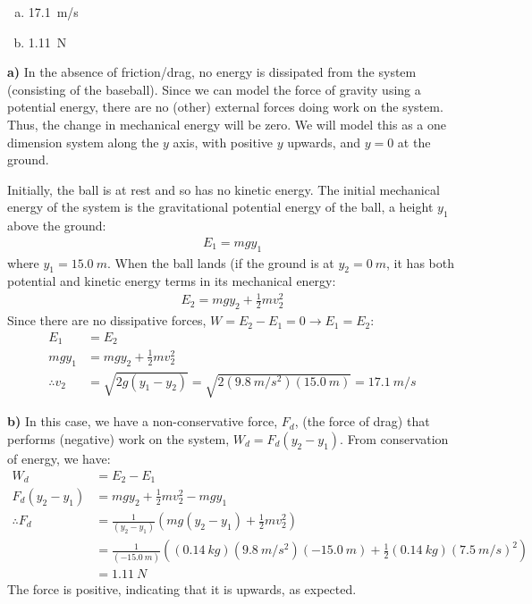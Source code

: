 \begin{finalanswer}
\begin{enumerate}[(a)]
\item \SI{17.1}{m/s}
\item \SI{1.11}{N}
\end{enumerate}
\end{finalanswer}
\begin{solution}
\textbf{a)}
In the absence of friction/drag, no energy is dissipated from the system (consisting of the baseball). Since we can model the force of gravity using a potential energy, there are no (other) external forces doing work on the system. Thus, the change in mechanical energy will be zero. We will model this as a one dimension system along the $y$ axis, with positive $y$ upwards, and $y=0$ at the ground.

Initially, the ball is at rest and so has no kinetic energy. The initial mechanical energy of the system is the gravitational potential energy of the ball, a height $y_1$ above the ground:
\begin{align*}
E_1 = mgy_1
\end{align*}
where $y_1=\SI{15.0}{m}$. When the ball lands (if the ground is at $y_2=\SI{0}{m}$, it has both potential and kinetic energy terms in its mechanical energy:
\begin{align*}
E_2 = mgy_2+\frac{1}{2}mv_2^2
\end{align*}
Since there are no dissipative forces, $W=E_2-E_1=0\to E_1=E_2$:
\begin{align*}
E_1 &= E_2\\
mgy_1 &= mgy_2+\frac{1}{2}mv_2^2\\
\therefore v_2&=\sqrt{2g(y_1-y_2)}=\sqrt{2(\SI{9.8}{m/s^2})(\SI{15.0}{m})}=\SI{17.1}{m/s}
\end{align*}

\textbf{b)} In this case, we have a non-conservative force, $F_d$, (the force of drag) that performs (negative) work on the system,  $W_d=F_d(y_2-y_1)$. From conservation of energy, we have:
\begin{align*}
W_d &= E_2-E_1\\
F_d(y_2-y_1) &=mgy_2+\frac{1}{2}mv_2^2 - mgy_1\\
\therefore F_d &= \frac{1}{(y_2-y_1)}\left( mg(y_2-y_1)+\frac{1}{2}mv_2^2  \right)\\
&=\frac{1}{(\SI{-15.0}{m})}\left((\SI{0.14}{kg})(\SI{9.8}{m/s^2})(\SI{-15.0}{m})+\frac{1}{2}(\SI{0.14}{kg})(\SI{7.5}{m/s})^2\right)\\
&=\SI{1.11}{N}
\end{align*}
The force is positive, indicating that it is upwards, as expected.
\end{solution}

